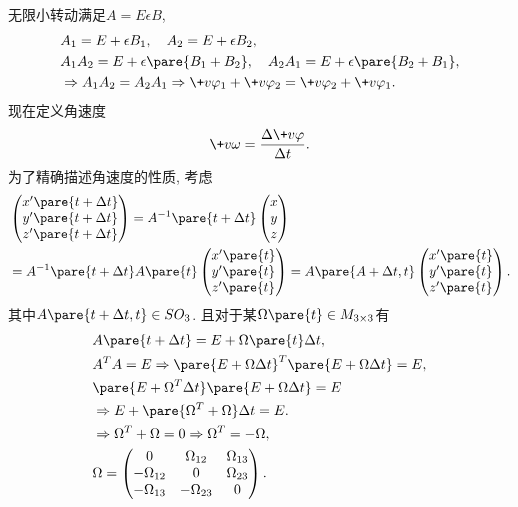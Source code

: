 \documentclass[../LectureNotes.tex]{subfiles}
\begin{document}
无限小转动满足$A = E\epsilon B$,
\begin{align*}
    & A_1 = E + \epsilon B_1,\quad A_2 = E + \epsilon B_2, \\
    & A_1A_2 = E + \epsilon\pare{B_1+B_2},\quad A_2A_1 = E + \epsilon\pare{B_2+B_1}, \\
    & \Rightarrow A_1 A_2 = A_2 A_1 \Rightarrow \+v\varphi_1 + \+v\varphi_2 = \+v\varphi_2 + \+v\varphi_1.
\end{align*}
现在定义角速度
\[ \+v\omega = \frac{\Delta\+v\varphi}{\Delta t}. \]
为了精确描述角速度的性质, 考虑
\begin{align*}
    &\begin{pmatrix}
        x'\pare{t+\Delta t} \\ y'\pare{t+\Delta t} \\ z'\pare{t+\Delta t}
    \end{pmatrix} = A^{-1}\pare{t+\Delta t}\begin{pmatrix}
        x \\ y \\ z
    \end{pmatrix} \\
    &= A^{-1}\pare{t+\Delta t}A\pare{t} \begin{pmatrix}
        x'\pare{t} \\ y'\pare{t} \\ z'\pare{t}
    \end{pmatrix}
    = A\pare{A+\Delta t, t} \begin{pmatrix}
        x'\pare{t} \\ y'\pare{t} \\ z'\pare{t}
    \end{pmatrix}.
\end{align*}
其中$A\pare{t+\Delta t, t}\in SO_3$. 且对于某$\Omega\pare{t}\in M_{3\times 3}$有
\begin{align*}
    & A\pare{t+\Delta t} = E+\Omega\pare{t}\Delta t, \\
    & A^T A = E \Rightarrow \pare{E+\Omega \Delta t}^T\pare{E + \Omega \Delta t} = E, \\
    & \pare{E + \Omega^T \Delta t} \pare{E + \Omega \Delta t} = E \\
    & \Rightarrow E + \pare{\Omega^T + \Omega} \Delta t = E. \\
    & \Rightarrow \Omega^T + \Omega = 0 \Rightarrow \Omega^T = -\Omega, \\
    & \Omega = \begin{pmatrix}
        0 & \Omega_{12} & \Omega_{13} \\
        -\Omega_{12} & 0 & \Omega_{23} \\
        -\Omega_{13} & -\Omega_{23} & 0
    \end{pmatrix}.
\end{align*}
\end{document}

